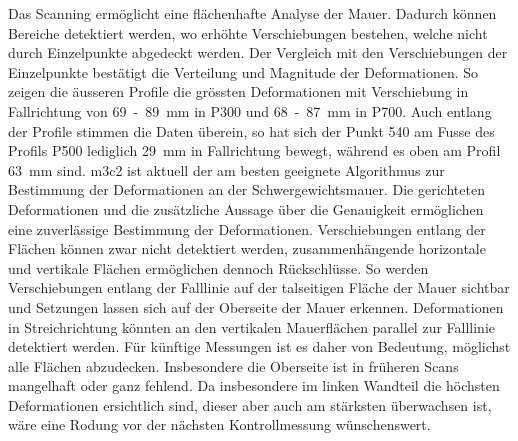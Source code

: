 Das Scanning ermöglicht eine flächenhafte Analyse der Mauer. Dadurch können Bereiche detektiert werden, wo erhöhte Verschiebungen 
bestehen, welche nicht durch Einzelpunkte abgedeckt werden. Der Vergleich mit den Verschiebungen der Einzelpunkte bestätigt die Verteilung und 
Magnitude der Deformationen. So zeigen die äusseren Profile die grössten Deformationen mit Verschiebung in Fallrichtung von 69~-~89~mm in P300 und 
68~-~87~mm in P700. Auch entlang der Profile stimmen die Daten überein, so hat sich der Punkt 540 am Fusse des Profils P500 lediglich 29~mm in 
Fallrichtung bewegt, während es oben am Profil 63~mm sind. 
\gls{m3c2} ist aktuell der am besten geeignete Algorithmus zur Bestimmung der Deformationen an der Schwergewichtsmauer. Die 
gerichteten Deformationen und die zusätzliche Aussage über die Genauigkeit ermöglichen eine zuverlässige Bestimmung der 
Deformationen. Verschiebungen entlang der Flächen können zwar nicht detektiert werden, zusammenhängende horizontale und 
vertikale Flächen ermöglichen dennoch Rückschlüsse. So werden Verschiebungen entlang der Falllinie auf der talseitigen 
Fläche der Mauer sichtbar und Setzungen lassen sich auf der Oberseite der Mauer erkennen. Deformationen in Streichrichtung 
könnten an den vertikalen Mauerflächen parallel zur Falllinie detektiert werden. Für künftige Messungen ist es daher von 
Bedeutung, möglichst alle Flächen abzudecken. Insbesondere die Oberseite ist in früheren Scans mangelhaft oder ganz fehlend. 
Da insbesondere im linken Wandteil die höchsten Deformationen ersichtlich sind, dieser aber auch am stärksten überwachsen ist, 
wäre eine Rodung vor der nächsten Kontrollmessung wünschenswert.